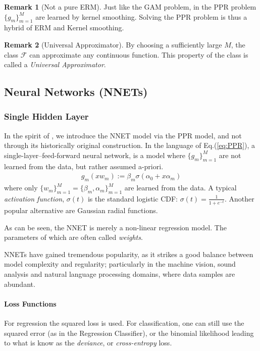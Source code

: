 \documentclass[12pt,a4paper]{article}
\theoremstyle{plain}
\theoremstyle{definition}
\newtheorem{remark}{Remark}
\newcommand{\hypclass}{\mathcal{F}}
\begin{document}
\begin{remark}[Not a pure ERM]
Just like the GAM problem, in the PPR problem $\{g_m\}_{m=1}^M$ are learned by kernel smoothing. Solving the PPR problem is thus a hybrid of ERM and Kernel smoothing. 
\end{remark}

\begin{remark}[Universal Approximator]
By choosing a sufficiently large $M$, the class $\hypclass$ can approximate any continuous function. This property of the class is called a \emph{Universal Approximator}.
\end{remark}




\subsection{Neural Networks (NNETs)}
\subsubsection{Single Hidden Layer}
In the spirit of \cite[Section 11]{hastie_elements_2003}, we introduce the NNET model via the PPR model, and not through its historically original construction.
In the language of Eq.(\ref{eq:PPR}), a single-layer--feed-forward neural network, is a model where $\{g_m\}_{m=1}^M$  are not learned from the data, but rather assumed a-priori. 
\begin{align*}
	g_m(x w_m):= \beta_m \sigma(\alpha_0 + x \alpha_m )
\end{align*}
where only $\{w_m\}_{m=1}^M = \{\beta_m, \alpha_m\}_{m=1}^M$ are learned from the data. 
A typical \emph{activation function}, $\sigma(t)$ is the standard logistic CDF: $\sigma(t)=\frac{1}{1+e^{-t}}$. Another popular alternative are Gaussian radial functions.

As can be seen, the NNET is merely a non-linear regression model.
The parameters of which are often called \emph{weights}.

NNETs have gained tremendous popularity, as it strikes a good balance between model complexity and regularity; particularly in the machine vision, sound analysis and natural language processing domains, where data samples are abundant.

\paragraph{Loss Functions}
For regression the squared loss is used. For classification, one can still use the squared error (as in the Regression Classifier), or the binomial likelihood leading to what is know as the \emph{deviance}, or \emph{cross-entropy} loss.
\end{document}
